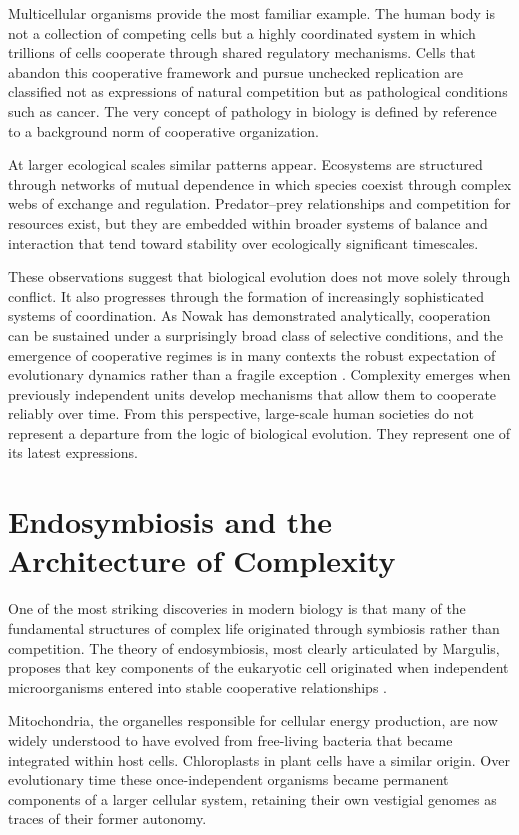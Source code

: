\documentclass[12pt]{article}
\begin{document}
Multicellular organisms provide the most familiar example. The human body is not a collection of competing cells but a highly coordinated system in which trillions of cells cooperate through shared regulatory mechanisms. Cells that abandon this cooperative framework and pursue unchecked replication are classified not as expressions of natural competition but as pathological conditions such as cancer. The very concept of pathology in biology is defined by reference to a background norm of cooperative organization.

At larger ecological scales similar patterns appear. Ecosystems are structured through networks of mutual dependence in which species coexist through complex webs of exchange and regulation. Predator--prey relationships and competition for resources exist, but they are embedded within broader systems of balance and interaction that tend toward stability over ecologically significant timescales.

These observations suggest that biological evolution does not move solely through conflict. It also progresses through the formation of increasingly sophisticated systems of coordination. As Nowak has demonstrated analytically, cooperation can be sustained under a surprisingly broad class of selective conditions, and the emergence of cooperative regimes is in many contexts the robust expectation of evolutionary dynamics rather than a fragile exception \cite{nowak2006}. Complexity emerges when previously independent units develop mechanisms that allow them to cooperate reliably over time. From this perspective, large-scale human societies do not represent a departure from the logic of biological evolution. They represent one of its latest expressions.

\section{Endosymbiosis and the Architecture of Complexity}
\label{sec:endo}

One of the most striking discoveries in modern biology is that many of the fundamental structures of complex life originated through symbiosis rather than competition. The theory of endosymbiosis, most clearly articulated by Margulis, proposes that key components of the eukaryotic cell originated when independent microorganisms entered into stable cooperative relationships \cite{margulis1970}.

Mitochondria, the organelles responsible for cellular energy production, are now widely understood to have evolved from free-living bacteria that became integrated within host cells. Chloroplasts in plant cells have a similar origin. Over evolutionary time these once-independent organisms became permanent components of a larger cellular system, retaining their own vestigial genomes as traces of their former autonomy.
\end{document}
